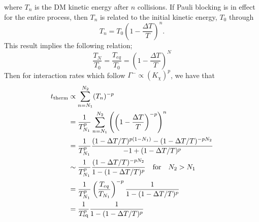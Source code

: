 where $T_n$ is the DM kinetic energy after $n$ collisions. If Pauli blocking is in effect for the entire process, then $T_n$ is related to the initial kinetic energy, $T_0$ through
\begin{equation}
    T_n = T_0\left( 1 - \frac{\Delta T}{T}\right)^n.
\end{equation}
This result implies the following relation;
\begin{equation}
    \frac{T_N}{T_0} = \frac{T_{eq}}{T_0} = \left( 1 - \frac{\Delta T}{T}\right)^N
\end{equation}
Then for interaction rates which follow $\Gamma^-\propto (K_\chi)^p$, we have that 
\begin{align}
    t_{\rm therm} & \propto \sum_{n=N_1}^{N_2} (T_n)^{-p}\\
    & = \frac{1}{T_{N_1}^{p}}\sum_{n=N_1}^{N_2}\left(\left( 1 - \frac{\Delta T}{T}\right)^{-p}\right)^n\\
    & = \frac{1}{T_{N_1}^{p}}\frac{(1 - \Delta T/T)^{p(1-N_1)} - (1 -\Delta T/T)^{-p N_2}}{-1 + (1 - \Delta T/T)^p}\\
    & \sim  \frac{1}{T_{N_1}^{p}} \frac{(1 -\Delta T/T)^{-p N_2}}{1 - (1 - \Delta T/T)^p}\quad \text{for}\quad N_2 > N_1\\
    & =  \frac{1}{T_{N_1}^{p}} \left( \frac{T_{eq}}{T_{N_1}}\right)^{-p}\frac{1}{1 - (1 - \Delta T/T)^p}\\
    & = \frac{1}{T_{\rm eq}^p}\frac{1}{1 - (1 - \Delta T/T)^p}
\end{align}

